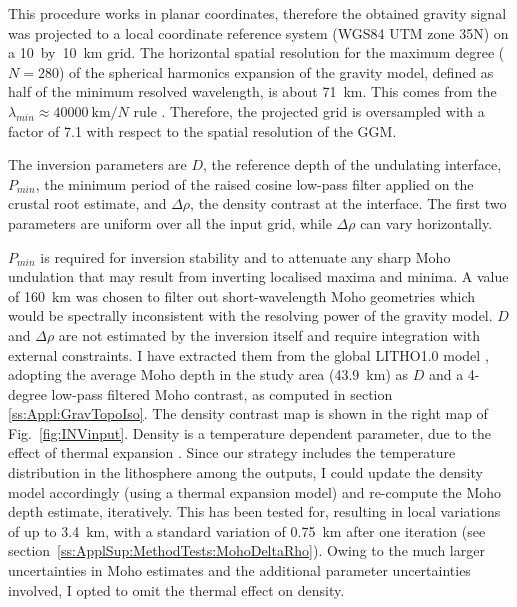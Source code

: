 This procedure works in planar coordinates, therefore the obtained gravity signal was projected to a local coordinate reference system (WGS84 UTM zone 35N) on a 10~by~10~{km} grid.
The horizontal spatial resolution for the maximum degree ($N=280$) of the spherical harmonics expansion of the gravity model, defined as half of the minimum resolved wavelength, is about 71~\si{\kilo \metre}. This comes from the $\lambda_{min} \approx 40000~\textrm{km} / N $ rule \parencite{HofmannWellenhof2006}.
Therefore, the projected grid is oversampled with a factor of 7.1 with respect to the spatial resolution of the GGM.

The inversion parameters are $D$, the reference depth of the undulating interface, $P_{min}$, the minimum period of the raised cosine low-pass filter applied on the crustal root estimate, and $\Delta \rho$, the density contrast at the interface.
The first two parameters are uniform over all the input grid, while $\Delta \rho$ can vary horizontally.

$P_{min}$ is required for inversion stability and to attenuate any sharp Moho undulation that may result from inverting localised maxima and minima.
A value of 160~{km} was chosen to filter out short-wavelength Moho geometries which would be spectrally inconsistent with the resolving power of the gravity model.
$D$ and $\Delta \rho$ are not estimated by the inversion itself and require integration with external constraints.
I have extracted them from the global {LITHO1.0} model \parencite{Pasyanos2014}, adopting the average Moho depth in the study area (43.9~\si{\kilo \metre}) as $D$ and a 4-degree low-pass filtered Moho contrast, as computed in section \ref{ss:Appl:GravTopoIso}.
The density contrast map is shown in the right map of Fig.~\ref{fig:INVinput}.
Density is a temperature dependent parameter, due to the effect of thermal expansion \parencite{allen2013basin}.
Since our strategy includes the temperature distribution in the lithosphere among the outputs, I could update the density model accordingly (using a thermal expansion model) and re-compute the Moho depth estimate, iteratively.
This has been tested for, resulting in local variations of up to \SI{3.4}{\kilo \metre}, with a standard variation of \SI{0.75}{\kilo \metre} after one iteration (see section~\ref{ss:ApplSup:MethodTests:MohoDeltaRho}).
Owing to the much larger uncertainties in Moho estimates \parencite[\textpm~5 to \textpm~15 percent, see ][]{Grad2009} and the additional parameter uncertainties involved, I opted to omit the thermal effect on density.

